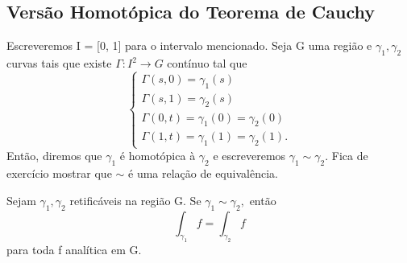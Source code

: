 \documentclass[ComplexAnalysis/complex.tex]{subfiles}
\begin{document}
\subsection{Versão Homotópica do Teorema de Cauchy}
Escreveremos I = [0, 1] para o intervalo mencionado. Seja G uma região e $\gamma_{1}, \gamma_{2}$ curvas tais que existe
\(\Gamma:I^{2}\rightarrow G\) contínuo tal que
$$
	\left\{\begin{array}{ll}
		\Gamma(s, 0) = \gamma_{1}(s)                 \\
		\Gamma(s, 1) = \gamma_{2}(s)                 \\
		\Gamma(0, t) = \gamma_{1}(0) = \gamma_{2}(0) \\
		\Gamma(1, t) = \gamma_{1}(1) = \gamma_{2}(1).
	\end{array}\right.
$$
Então, diremos que $\gamma_{1}$ é homotópica à $\gamma_{2}$ e escreveremos $\gamma_{1}\sim\gamma_{2}.$ Fica de exercício
mostrar que $\sim$ é uma relação de equivalência.
\begin{theorem*}
	Sejam $\gamma_{1}, \gamma_{2}$ retificáveis na região G. Se $\gamma_{1}\sim \gamma_{2},$ então
	$$
		\int_{\gamma_{1}}f = \int_{\gamma_{2}}f
	$$
	para toda f analítica em G.
\end{theorem*}
\end{document}
